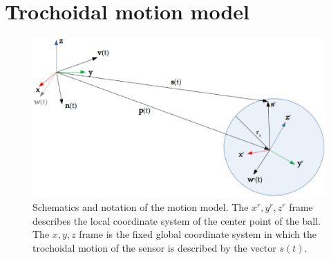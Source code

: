 \section{Trochoidal motion model}

\begin{figure}
  \centering
  \includegraphics[width=0.7\linewidth]{img/schematics}
  \caption{Schematics and notation of the motion model. 
  The $x^r, y^r, z^r$ frame describes the local coordinate system of the center point of the ball.
  The $x,y,z$ frame is the fixed global coordinate system in which the trochoidal motion of the sensor is described by the vector $s(t)$.}
  \label{fig:schematics}
\end{figure}

